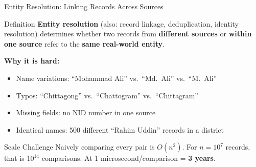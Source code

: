 \documentclass[aspectratio=169,10pt]{beamer}
\begin{document}
\begin{frame}{Entity Resolution: Linking Records Across Sources}
  
      \begin{block}{Definition}
        \textbf{Entity resolution} (also: record linkage, deduplication, identity resolution) determines whether two records from \textbf{different sources} or \textbf{within one source} refer to the \textbf{same real-world entity}.
      \end{block}
      \vspace{4pt}
      \textbf{Why it is hard:}
      \begin{itemize}
        \item Name variations: ``Mohammad Ali'' vs.\ ``Md.\ Ali'' vs.\ ``M.\ Ali''
        \item Typos: ``Chittagong'' vs.\ ``Chattogram'' vs.\ ``Chittagram''
        \item Missing fields: no NID number in one source
        \item Identical names: 500 different ``Rahim Uddin'' records in a district
      \end{itemize}
      \vspace{4pt}
      \begin{alertblock}{Scale Challenge}
        Naively comparing every pair is $O(n^2)$.  For $n = 10^7$ records, that is $10^{14}$ comparisons.  At 1 microsecond/comparison = \textbf{3 years}.
      \end{alertblock}

     
\end{frame}
\end{document}
